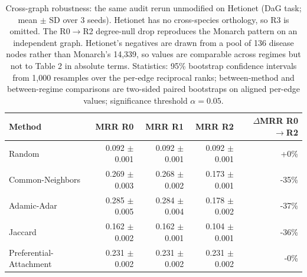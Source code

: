 \begin{table}[H]
\centering
\caption{Cross-graph robustness: the same audit rerun unmodified on Hetionet (DaG task; mean $\pm$ SD over 3 seeds). Hetionet has no cross-species orthology, so R3 is omitted. The R0$\to$R2 degree-null drop reproduces the Monarch pattern on an independent graph. Hetionet's negatives are drawn from a pool of 136 disease nodes rather than Monarch's 14,339, so values are comparable across regimes but not to Table 2 in absolute terms. Statistics: 95\% bootstrap confidence intervals from 1,000 resamples over the per-edge reciprocal ranks; between-method and between-regime comparisons are two-sided paired bootstraps on aligned per-edge values; significance threshold $\alpha = 0.05$.}
\label{tab:hetionet}
\begin{tabular}{lrrrr}
\toprule
Method & MRR R0 & MRR R1 & MRR R2 & $\Delta$MRR R0$\to$R2 \\
\midrule
Random & 0.092 $\pm$ 0.001 & 0.092 $\pm$ 0.001 & 0.092 $\pm$ 0.001 & +0\% \\
Common-Neighbors & 0.269 $\pm$ 0.003 & 0.268 $\pm$ 0.002 & 0.173 $\pm$ 0.001 & -35\% \\
Adamic-Adar & 0.285 $\pm$ 0.005 & 0.284 $\pm$ 0.004 & 0.178 $\pm$ 0.002 & -37\% \\
Jaccard & 0.162 $\pm$ 0.002 & 0.162 $\pm$ 0.001 & 0.104 $\pm$ 0.001 & -36\% \\
Preferential-Attachment & 0.231 $\pm$ 0.002 & 0.231 $\pm$ 0.002 & 0.231 $\pm$ 0.002 & -0\% \\
\bottomrule
\end{tabular}
\end{table}
